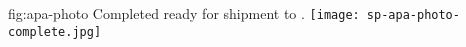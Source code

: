 \begin{dunefigure}{fig:apa-photo}
{Completed   ready for shipment to .}
\texttt{[image: sp-apa-photo-complete.jpg]}
\end{dunefigure}
